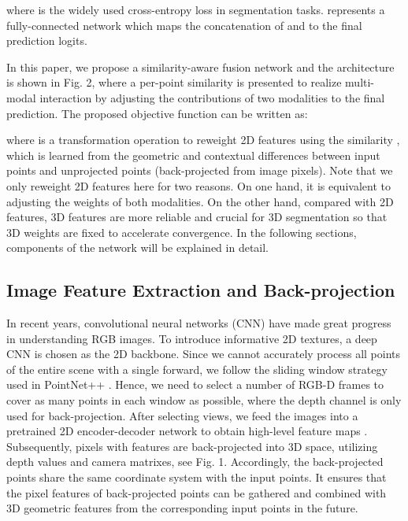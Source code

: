 \documentclass[letterpaper, 10 pt, conference]{ieeeconf}
\begin{document}
where  is the widely used cross-entropy loss in segmentation tasks.  represents a fully-connected network which maps the concatenation of  and  to the final prediction logits.

In this paper, we propose a similarity-aware fusion network and the architecture is shown in Fig. 2, where a per-point similarity is presented to realize multi-modal interaction by adjusting the contributions of two modalities to the final prediction. The proposed objective function can be written as:

where  is a transformation operation to reweight 2D features using the similarity , which is learned from the geometric and contextual differences between input points and unprojected points (back-projected from image pixels). Note that we only reweight 2D features here for two reasons. On one hand, it is equivalent to adjusting the weights of both modalities. On the other hand, compared with 2D features, 3D features are more reliable and crucial for 3D segmentation so that 3D weights are fixed to accelerate convergence.
In the following sections, components of the network will be explained in detail.




\subsection{Image Feature Extraction and Back-projection}

In recent years, convolutional neural networks (CNN) have made great progress in understanding RGB images. To introduce informative 2D textures, a deep CNN is chosen as the 2D backbone. Since we cannot accurately process all points of the entire scene with a single forward, we follow the sliding window strategy used in PointNet++ \cite{qi2017pointnet++}. Hence, we need to select a number of RGB-D frames to cover as many points in each window as possible, where the depth channel is only used for back-projection. After selecting views, we feed the images into a pretrained 2D encoder-decoder network to obtain high-level feature maps . Subsequently, pixels with features are back-projected into 3D space, utilizing depth values and camera matrixes, see Fig. 1. Accordingly, the back-projected points share the same coordinate system with the input points. It ensures that the pixel features of back-projected points can be gathered and combined with 3D geometric features from the corresponding input points in the future. 
\end{document}
